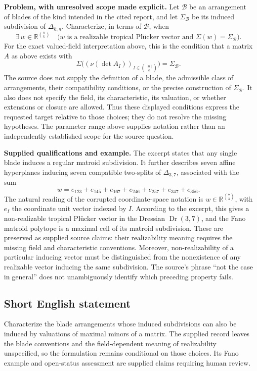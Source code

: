 \documentclass[11pt]{article}
\newcommand{\R}{\mathbb{R}}
\begin{document}
\textbf{Problem, with unresolved scope made explicit.} Let \(\mathcal B\) be an arrangement of blades of the kind intended in the cited report, and let \(\Sigma_{\mathcal B}\) be its induced subdivision of \(\Delta_{k,n}\). Characterize, in terms of \(\mathcal B\), when
\[
\exists\,w\in\R^{\binom nk}\quad
\bigl(w\text{ is a realizable tropical Pl\"ucker vector and }
\Sigma(w)=\Sigma_{\mathcal B}\bigr).
\]
For the exact valued-field interpretation above, this is the condition that a matrix \(A\) as above exists with
\[
\Sigma\bigl((\nu(\det A_I))_{I\in\binom{[n]}k}\bigr)
=\Sigma_{\mathcal B}.
\]
The source does not supply the definition of a blade, the admissible class of arrangements, their compatibility conditions, or the precise construction of \(\Sigma_{\mathcal B}\). It also does not specify the field, its characteristic, its valuation, or whether extensions or closure are allowed. Thus these displayed conditions express the requested target relative to those choices; they do not resolve the missing hypotheses. The parameter range above supplies notation rather than an independently established scope for the source question.

\textbf{Supplied qualifications and example.} The excerpt states that any single blade induces a regular matroid subdivision. It further describes seven affine hyperplanes inducing seven compatible two-splits of \(\Delta_{3,7}\), associated with the sum
\[
w=e_{123}+e_{145}+e_{167}+e_{246}+e_{257}+e_{347}+e_{356}.
\]
The natural reading of the corrupted coordinate-space notation is \(w\in\R^{\binom73}\), with \(e_I\) the coordinate unit vector indexed by \(I\). According to the excerpt, this gives a non-realizable tropical Pl\"ucker vector in the Dressian \(\operatorname{Dr}(3,7)\), and the Fano matroid polytope is a maximal cell of its matroid subdivision. These are preserved as supplied source claims: their realizability meaning requires the missing field and characteristic conventions. Moreover, non-realizability of a particular inducing vector must be distinguished from the nonexistence of any realizable vector inducing the same subdivision. The source's phrase ``not the case in general'' does not unambiguously identify which preceding property fails.
\subsection{Short English statement}
Characterize the blade arrangements whose induced subdivisions can also be induced by valuations of maximal minors of a matrix. The supplied record leaves the blade conventions and the field-dependent meaning of realizability unspecified, so the formulation remains conditional on those choices. Its Fano example and open-status assessment are supplied claims requiring human review.
\end{document}
